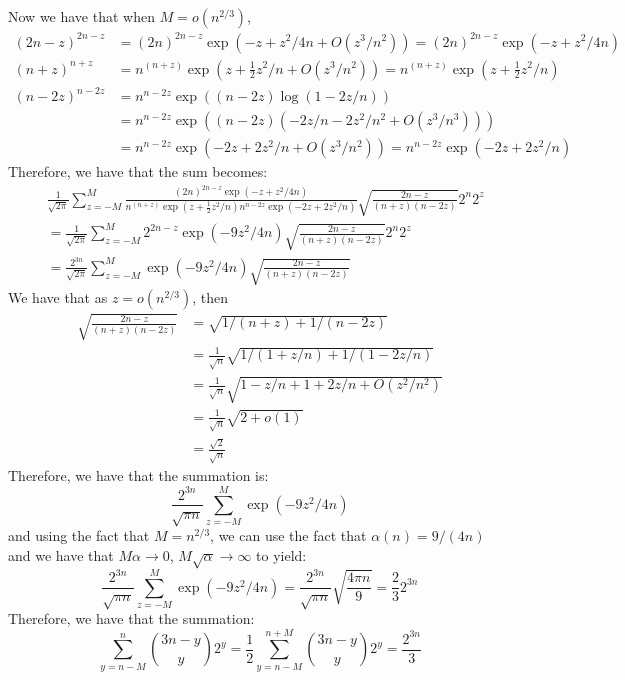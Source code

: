 \documentclass[]{article}
\theoremstyle{definition}
\numberwithin{theorem}{section}
\numberwithin{equation}{section}
\begin{document}
Now we have that when $M = o(n^{2/3})$,
\begin{align*}
	(2n - z)^{2n-z}  &=  (2n)^{2n-z} \exp(-z + z^2/4n + O(z^3/n^2)) = (2n)^{2n-z} \exp(-z + z^2/4n)\\
	(n + z)^{n + z} &= n^{(n + z)} \exp(z + \frac{1}{2} z^2/n + O(z^3/n^2)) = n^{(n + z)} \exp(z + \frac{1}{2} z^2/n) \\
	(n - 2z)^{n - 2z} &= n^{n -2z} \exp\left( (n - 2z) \log(1 - 2z/n)\right)\\
	&= n^{n -2z} \exp\left( (n - 2z) (-2z/n - 2z^2/n^2 + O(z^3/n^3))\right)\\
	&= n^{n -2z} \exp\left( -2z + 2z^2/n + O(z^3/n^2)\right) = n^{n -2z} \exp( -2z + 2z^2/n)
\end{align*}
Therefore, we have that the sum becomes:
\begin{align*}
	&\frac{1}{\sqrt{2\pi}}\sum_{z = -M}^M \frac{(2n)^{2n-z} \exp(-z + z^2/4n) }{n^{(n + z)} \exp(z + \frac{1}{2} z^2/n) n^{n -2z} \exp( -2z + 2z^2/n) } \sqrt{\frac{2n - z}{(n + z)(n - 2z)}} 2^{n} 2^z\\
	&= \frac{1}{\sqrt{2\pi}}\sum_{z = -M}^M 2^{2n-z} \exp(- 9z^2/4n) \sqrt{\frac{2n - z}{(n + z)(n - 2z)}} 2^{n} 2^z\\
	&= \frac{2^{3n}}{\sqrt{2\pi}} \sum_{z = -M}^M  \exp(- 9z^2/4n) \sqrt{\frac{2n - z}{(n + z)(n - 2z)}}
\end{align*}
We have that as $z = o(n^{2/3})$, then
\begin{align*}
	\sqrt{\frac{2n - z}{(n + z)(n - 2z)}} &= \sqrt{1/(n + z) + 1/(n - 2z)}\\
	 &= \frac{1}{\sqrt{n}} \sqrt{1/(1 + z/n) + 1/(1 - 2z/n)}\\
	 &= \frac{1}{\sqrt{n}} \sqrt{1 -z/n + 1 + 2z/n + O(z^2/n^2)}\\
	 &= \frac{1}{\sqrt{n}} \sqrt{2 + o(1)}\\
	 &= \frac{\sqrt{2}}{\sqrt{n}} 
\end{align*}
Therefore, we have that the summation is:
\begin{equation}
	\frac{2^{3n}}{\sqrt{\pi n}} \sum_{z = -M}^M  \exp(- 9z^2/4n) 
\end{equation}
and using the fact that $ M = n^{2/3}$, we can use the fact that $\alpha(n) = 9/(4n)$ and we have that $M \alpha \rightarrow 0$, $M \sqrt{\alpha} \rightarrow \infty$ to yield:
\begin{equation}
	\frac{2^{3n}}{\sqrt{\pi n}} \sum_{z = -M}^M  \exp(- 9z^2/4n)  = \frac{2^{3n}}{\sqrt{\pi n}} \sqrt{\frac{4 \pi n}{9}} = \frac{2}{3} 2^{3n}
\end{equation}
Therefore, we have that the summation:
\begin{equation}
	\sum_{y = n - M}^n \binom{3n - y}{y} 2^y = \frac{1}{2} \sum_{y = n - M}^{n + M}\binom{3n - y}{y} 2^y = \frac{2^{3n}}{3}
\end{equation}
\end{document}
